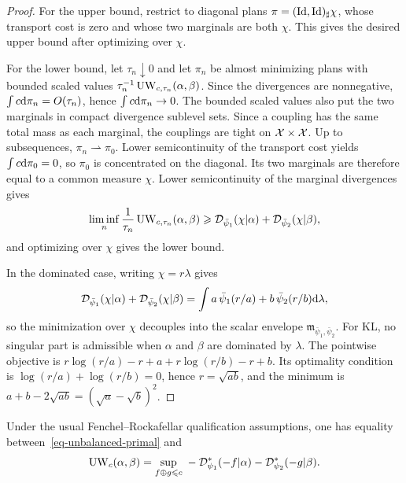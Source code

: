 \begin{proof}
	For the upper bound, restrict to diagonal plans $\pi=(\mathrm{Id},\mathrm{Id})_\sharp\chi$, whose transport cost is zero and whose two marginals are both $\chi$. This gives the desired upper bound after optimizing over $\chi$.

	For the lower bound, let $\tau_n\downarrow0$ and let $\pi_n$ be almost minimizing plans with bounded scaled values $\tau_n^{-1}\operatorname{UW}_{c,\tau_n}(\alpha,\beta)$. Since the divergences are nonnegative, $\int c\mathrm{d}\pi_n=O(\tau_n)$, hence $\int c\mathrm{d}\pi_n\to0$. The bounded scaled values also put the two marginals in compact divergence sublevel sets. Since a coupling has the same total mass as each marginal, the couplings are tight on $\mathcal{X}\times\mathcal{X}$. Up to subsequences, $\pi_n\rightharpoonup\pi_0$. Lower semicontinuity of the transport cost yields $\int c\mathrm{d}\pi_0=0$, so $\pi_0$ is concentrated on the diagonal. Its two marginals are therefore equal to a common measure $\chi$. Lower semicontinuity of the marginal divergences gives
	\[
		\liminf_n\frac1{\tau_n}\operatorname{UW}_{c,\tau_n}(\alpha,\beta)
		\geqslant
		\mathcal{D}_{\bar\psi_1}(\chi|\alpha)+\mathcal{D}_{\bar\psi_2}(\chi|\beta),
	\]
	and optimizing over $\chi$ gives the lower bound.

	In the dominated case, writing $\chi=r\lambda$ gives
	\[
		\mathcal{D}_{\bar\psi_1}(\chi|\alpha)+\mathcal{D}_{\bar\psi_2}(\chi|\beta)
		=
		\int
		a\,\bar\psi_1(r/a)+b\,\bar\psi_2(r/b)
		\mathrm{d}\lambda,
	\]
	so the minimization over $\chi$ decouples into the scalar envelope $\mathfrak m_{\bar\psi_1,\bar\psi_2}$. For KL, no singular part is admissible when $\alpha$ and $\beta$ are dominated by $\lambda$. The pointwise objective is $r\log(r/a)-r+a+r\log(r/b)-r+b$. Its optimality condition is $\log(r/a)+\log(r/b)=0$, hence $r=\sqrt{ab}$, and the minimum is $a+b-2\sqrt{ab}=(\sqrt a-\sqrt b)^2$.
\end{proof}

\begin{prop}\label{prop-dual-unbalanced-ot}
	Under the usual Fenchel--Rockafellar qualification assumptions, one has equality between~\eqref{eq-unbalanced-primal} and
	\[
		\operatorname{UW}_c(\alpha,\beta)
		=
		\underset{f\oplus g\leqslant c}{\sup}\;
		-
		\mathcal{D}_{\psi_1}^*(-f|\alpha)
		-
		\mathcal{D}_{\psi_2}^*(-g|\beta).
	\]
\end{prop}

